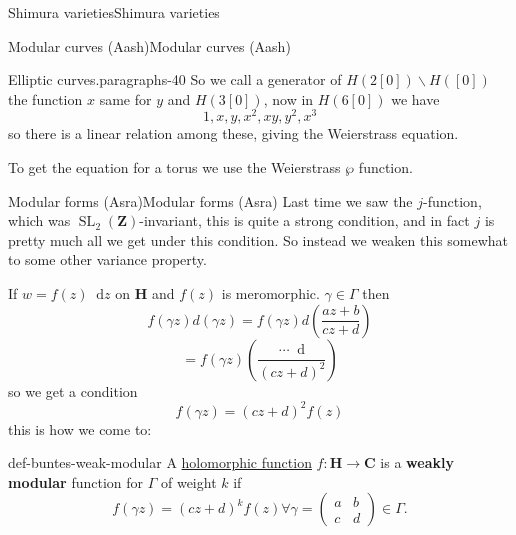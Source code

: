 \documentclass[10pt,]{book}
\newcommand{\terminology}[1]{\textbf{#1}}
\numberwithin{equation}{section}
\newcommand{\diff}{\mathop{}\!\mathrm{d}}
\newcommand{\lb}{[}
\newcommand{\rb}{]}
\newcommand{\ZZ}{\mathbf{Z}}
\newcommand{\CC}{\mathbf{C}}
\newcommand{\HH}{\mathbf{H}}
\DeclareMathOperator{\SL}{SL}
\newcommand{\amp}{&}
\begin{document}
\begin{chapterptx}{Shimura varieties}{}{Shimura varieties}{}{}
\begin{sectionptx}{Modular curves (Aash)}{}{Modular curves (Aash)}{}{}
\begin{paragraphs}{Elliptic curves.}{paragraphs-40}
So we call a generator of \(H(2\lb 0 \rb) \smallsetminus H(\lb 0 \rb)\) the function \(x\) same for \(y\) and \(H(3\lb 0 \rb)\), now in \(H(6 \lb 0 \rb)\) we have%
\begin{equation*}
1,x,y,x^2 ,xy,y^2,x^3
\end{equation*}
so there is a linear relation among these, giving the Weierstrass equation.%
\par
\hypertarget{p-1050}{}%
To get the equation for a torus we use the Weierstrass \(\wp\) function.%
\end{paragraphs}%
\end{sectionptx}
%
%
\typeout{************************************************}
\typeout{************************************************}
%
\begin{sectionptx}{Modular forms (Asra)}{}{Modular forms (Asra)}{}{}\label{sec-buntes-modular-forms}
\hypertarget{p-1051}{}%
Last time we saw the \(j\)-function, which was \(\SL_2(\ZZ)\)-invariant, this is quite a strong condition, and in fact \(j\) is pretty much all we get under this condition. So instead we weaken this somewhat to some other variance property.%
\par
\hypertarget{p-1052}{}%
If \(w = f(z) \diff z\) on \(\HH\) and \(f(z)\) is meromorphic. \(\gamma \in \Gamma\) then%
\begin{equation*}
f(\gamma z) d(\gamma z) = f(\gamma z) d\left( \frac{az+b}{cz+d} \right)
\end{equation*}
%
\begin{equation*}
= f(\gamma z) \left( \frac{\cdots \diff }{(cz+d)^2} \right)
\end{equation*}
so we get a condition%
\begin{equation*}
f(\gamma z) = (cz+d)^2 f(z)
\end{equation*}
this is how we come to:%
\begin{definition}{}{def-buntes-weak-modular}%
\hypertarget{p-1053}{}%
A \hyperref[def-morph-riem-surf]{holomorphic function} \(f\colon \HH \to \CC\) is a \terminology{weakly modular} function for \(\Gamma\) of weight \(k\) if%
\begin{equation*}
f(\gamma z) = (cz+d)^k f(z) \forall \gamma  = \begin{pmatrix} a\amp b \\ c \amp d    \end{pmatrix} \in \Gamma\text{.}
\end{equation*}
%
\end{definition}

\end{sectionptx}
\end{chapterptx}
\end{document}

